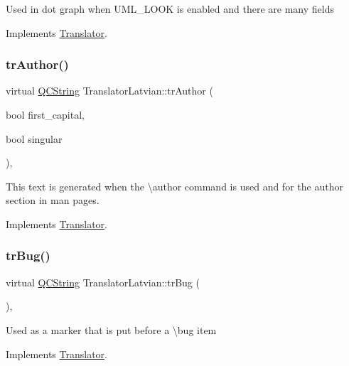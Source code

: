Used in dot graph when U\+M\+L\+\_\+\+L\+O\+OK is enabled and there are many fields 

Implements \mbox{\hyperlink{class_translator}{Translator}}.

\mbox{\label{class_translator_latvian_a560343a111fb14350d9ee29851ce3de2}} 
\subsubsection{\texorpdfstring{trAuthor()}{trAuthor()}}
{\footnotesize\ttfamily virtual \mbox{\hyperlink{class_q_c_string}{Q\+C\+String}} Translator\+Latvian\+::tr\+Author (\begin{DoxyParamCaption}\item[{bool}]{first\+\_\+capital,  }\item[{bool}]{singular }\end{DoxyParamCaption})\hspace{0.3cm}{\ttfamily [inline]}, {\ttfamily [virtual]}}

This text is generated when the \textbackslash{}author command is used and for the author section in man pages. 

Implements \mbox{\hyperlink{class_translator}{Translator}}.

\mbox{\label{class_translator_latvian_aa3fd977163a6ccdbc7617f7edfe2245d}} 
\subsubsection{\texorpdfstring{trBug()}{trBug()}}
{\footnotesize\ttfamily virtual \mbox{\hyperlink{class_q_c_string}{Q\+C\+String}} Translator\+Latvian\+::tr\+Bug (\begin{DoxyParamCaption}{ }\end{DoxyParamCaption})\hspace{0.3cm}{\ttfamily [inline]}, {\ttfamily [virtual]}}

Used as a marker that is put before a \textbackslash{}bug item 

Implements \mbox{\hyperlink{class_translator}{Translator}}.

\mbox{\label{class_translator_latvian_a2f139e8c57353ebcdc3b11daaa4ba4cc}} 
